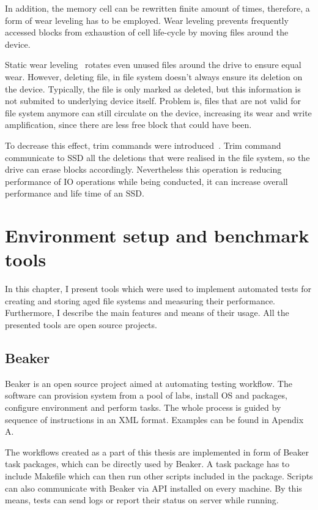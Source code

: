 \documentclass[
  color, %
  table, %
  lof,   %
  lot,   %
]{fithesis3}
\begin{document}
In addition, the memory cell can be rewritten finite amount of times, therefore, a form of wear leveling has to be employed. Wear leveling prevents frequently accessed blocks from exhaustion of cell life-cycle by moving files around the device.

Static wear leveling~\cite{Chang:2007:EEF:1278480.1278533} rotates even unused files around the drive to ensure equal wear. However, deleting file, in file system doesn't always ensure its deletion on the device. Typically, the file is only marked as deleted, but this information is not submited to underlying device itself. Problem is, files that are not valid for file system anymore can still circulate on the device, increasing its wear and write amplification, since there are less free block that could have been.

To decrease this effect, trim commands were introduced~\cite{Frankie:2012:MMT:2184512.2184527}. Trim command communicate to SSD all the deletions that were realised in the file system, so the drive can erase blocks accordingly. Nevertheless this operation is reducing performance of IO operations while being conducted, it can increase overall performance and life time of an SSD.



\chapter{Environment setup and benchmark tools}
\label{tools}
In this chapter, I present tools which were used to implement automated tests for creating and storing aged file systems and measuring their performance. Furthermore, I describe the main features and means of their usage. All the presented tools are open source projects.

\section{Beaker}
Beaker is an open source project aimed at automating testing workflow. The software can provision system from a pool of labs, install OS and packages, configure environment and perform tasks. The whole process is guided by sequence of instructions in an XML format. Examples can be found in Apendix A.

The workflows created as a part of this thesis are implemented in form of Beaker task packages, which can be directly used by Beaker. A task package has to include Makefile which can then run other scripts included in the package. Scripts can also communicate with Beaker via API installed on every machine.  By this means, tests can send logs or report their status on server while running.
\end{document}
